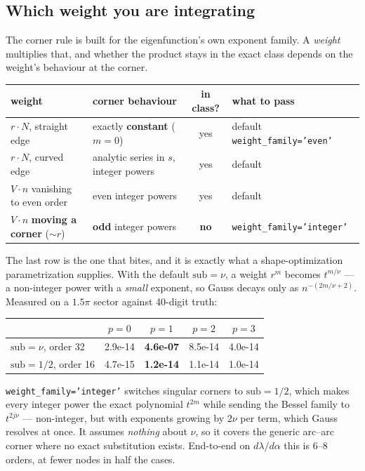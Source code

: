 \documentclass[11pt]{article}
\newcommand{\code}[1]{\texttt{#1}}
\begin{document}
\subsection{Which weight you are integrating}

The corner rule is built for the eigenfunction's own exponent family. A
\emph{weight} multiplies that, and whether the product stays in the exact class
depends on the weight's behaviour at the corner.

\begin{center}\small
\begin{tabularx}{\textwidth}{@{}l L c l@{}}
\toprule
\textbf{weight} & \textbf{corner behaviour} & \textbf{in class?} & \textbf{what to pass} \\
\midrule
$r\cdot N$, straight edge & exactly \textbf{constant} ($m=0$) & yes & default \code{weight\_family='even'} \\
$r\cdot N$, curved edge & analytic series in $s$, integer powers & yes & default \\
$V\cdot n$ vanishing to even order & even integer powers & yes & default \\
$V\cdot n$ \textbf{moving a corner} ($\sim r$) & \textbf{odd} integer powers & \textbf{no} & \code{weight\_family='integer'} \\
\bottomrule
\end{tabularx}
\end{center}

The last row is the one that bites, and it is exactly what a shape-optimization
parametrization supplies. With the default $\text{sub} = \nu$, a weight $r^m$
becomes $t^{m/\nu}$ --- a non-integer power with a \emph{small} exponent, so
Gauss decays only as $n^{-(2m/\nu+2)}$. Measured on a $1.5\pi$ sector against
40-digit truth:

\begin{center}\small
\begin{tabular}{@{}lcccc@{}}
\toprule
 & $p=0$ & $p=1$ & $p=2$ & $p=3$ \\
\midrule
$\text{sub} = \nu$, order 32   & 2.9e-14 & \textbf{4.6e-07} & 8.5e-14 & 4.0e-14 \\
$\text{sub} = 1/2$, order 16   & 4.7e-15 & \textbf{1.2e-14} & 1.1e-14 & 1.0e-14 \\
\bottomrule
\end{tabular}
\end{center}

\code{weight\_family='integer'} switches singular corners to $\text{sub} = 1/2$,
which makes every integer power the exact polynomial $t^{2m}$ while sending the
Bessel family to $t^{2j\nu}$ --- non-integer, but with exponents growing by
$2\nu$ per term, which Gauss resolves at once. It assumes \emph{nothing} about
$\nu$, so it covers the generic arc--arc corner where no exact substitution
exists. End-to-end on $d\lambda/d\alpha$ this is 6--8 orders, at fewer nodes in
half the cases.
\end{document}
